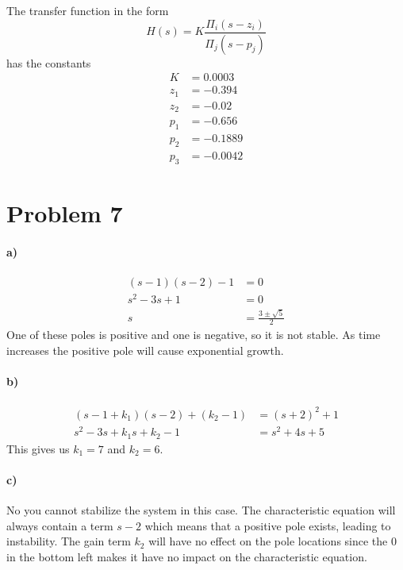 \documentclass[12pt]{article}
\begin{document}
The transfer function in the form
\[H(s)=K\frac{\Pi_i (s-z_i)}{\Pi_j(s-p_j)}\]
has the constants
\begin{align*}
    K&=0.0003\\
    z_1&=-0.394\\
    z_2&=-0.02\\
    p_1&=-0.656\\
    p_2&=-0.1889\\
    p_3&=-0.0042
\end{align*}

\section*{Problem 7}

\paragraph{a)}

\begin{align*}
    (s-1)(s-2)-1 &= 0\\
    s^2-3s+1 &= 0\\
    s&=\frac{3\pm\sqrt{5}}{2}
\end{align*}
One of these poles is positive and one is negative, so it is not stable. As time increases the positive pole will
cause exponential growth.

\paragraph{b)}

\begin{align*}
    (s-1+k_1)(s-2)+(k_2-1) &= (s+2)^2 + 1\\
    s^2-3s+k_1s+k_2-1 &= s^2+4s+5
\end{align*}
This gives us \(k_1=7\) and \(k_2=6\).

\paragraph{c)}

No you cannot stabilize the system in this case. The characteristic equation will always contain a term \(s-2\) which means
that a positive pole exists, leading to instability. The gain term \(k_2\) will have no effect on the pole locations since the
0 in the bottom left makes it have no impact on the characteristic equation.
\end{document}
